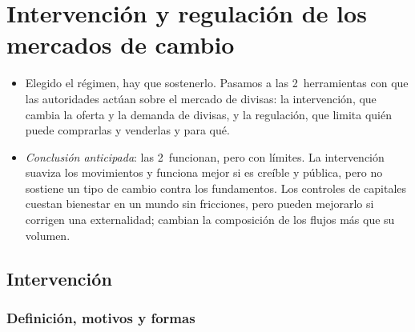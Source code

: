 \documentclass[11pt]{article}
\begin{document}
\section{Intervención y regulación de los mercados de cambio}\label{sec:intervencion-regulacion}

\begin{itemize}
\item Elegido el régimen, hay que sostenerlo. Pasamos a las 2~herramientas con que las autoridades actúan sobre el mercado de divisas: la intervención, que cambia la oferta y la demanda de divisas, y la regulación, que limita quién puede comprarlas y venderlas y para qué.
\item \emph{Conclusión anticipada}: las 2~funcionan, pero con límites. La intervención suaviza los movimientos y funciona mejor si es creíble y pública, pero no sostiene un tipo de cambio contra los fundamentos. Los controles de capitales cuestan bienestar en un mundo sin fricciones, pero pueden mejorarlo si corrigen una externalidad; cambian la composición de los flujos más que su volumen.
\end{itemize}

\subsection{Intervención}\label{sec:intervencion}

\subsubsection{Definición, motivos y formas}\label{sec:intervencion-formas}
\end{document}
